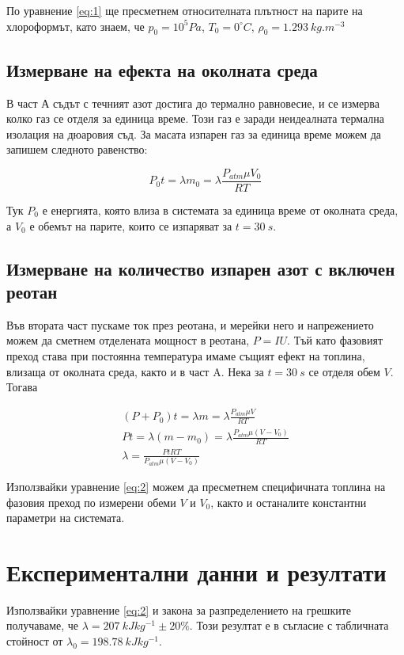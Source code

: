 \documentclass[%
 reprint,
 amsmath,amssymb,
 aps,
]{revtex4-2}
\newcommand{\degree}{^{\circ}}
\begin{document}
По уравнение \eqref{eq:1} ще пресметнем относителната плътност на парите на хлороформът, като знаем, че $p_0 = 10^5 Pa$, $T_0 = 0\degree C$, $\rho_0 = 1.293 \ \si{kg.m^{-3}}$
\subsection{Измерване на ефекта на околната среда}

В част А съдът с течният азот достига до термално равновесие, и се измерва колко газ се отделя за единица време. Този газ е заради неидеалната термална изолация на дюаровия съд. За масата изпарен газ за единица време можем да запишем следното равенство:

\begin{equation*} \label{eq:1}
    P_0 t = \lambda m_0 = \lambda \frac{P_{atm} \mu V_0}{RT} \tag{1}
\end{equation*}

Тук $P_0$ е енергията, която влиза в системата за единица време от околната среда, а $V_0$ е обемът на парите, които се изпаряват за $t=30 \ \si{s}$. 

\subsection{Измерване на количество изпарен азот с включен реотан}
Във втората част пускаме ток през реотана, и мерейки него и напрежението можем да сметнем отделената мощност в реотана, $P = IU$. Тъй като фазовият преход става при постоянна температура имаме същият ефект на топлина, влизаща от околната среда, както и в част A. Нека за $t=30 \ \si{s}$ се отделя обем $V$. Тогава 

\begin{gather*}
    (P + P_0) t = \lambda m = \lambda \frac{P_{atm}\mu V}{RT} \\
    P t = \lambda (m - m_0) = \lambda \frac{P_{atm}\mu (V - V_0)}{RT} \\
    \lambda = \frac{PtRT}{P_{atm}\mu(V - V_0)} \label{eq:2} \tag{2}
\end{gather*}

Използвайки уравнение \eqref{eq:2} можем да пресметнем специфичната топлина на фазовия преход по измерени обеми $V$ и $V_0$, както и останалите константни параметри на системата.
\section{Експериментални данни и резултати}

Използвайки уравнение \eqref{eq:2} и закона за разпределението на грешките получаваме, че $\lambda = 207 \ \si{kJ kg^{-1}} \pm 20\%$. Този резултат е в съгласие с табличната стойност от $\lambda_0 = 198.78 \ \si{kJ kg^{-1}}$.
\end{document}
